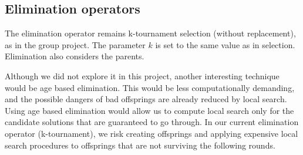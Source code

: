 \documentclass[a4paper,10pt]{article}
\newcommand{\ReplaceMe}[1]{{\color{blue}#1}}
\begin{document}
\subsection{Elimination operators}
	
	The elimination operator remains k-tournament selection (without replacement), as in the group project. The parameter $k$ is set to the same value as in selection. Elimination also considers the parents.
	
	Although we did not explore it in this project, another interesting technique would be age based elimination. This would be less computationally demanding, and the possible dangers of bad offsprings are already reduced by local search. Using age based elimination would allow us to compute local search only for the candidate solutions that are guaranteed to go through. In our current elimination operator (k-tournament), we risk creating offsprings and applying expensive local search procedures to offsprings that are not surviving the following rounds.
	
\end{document}
